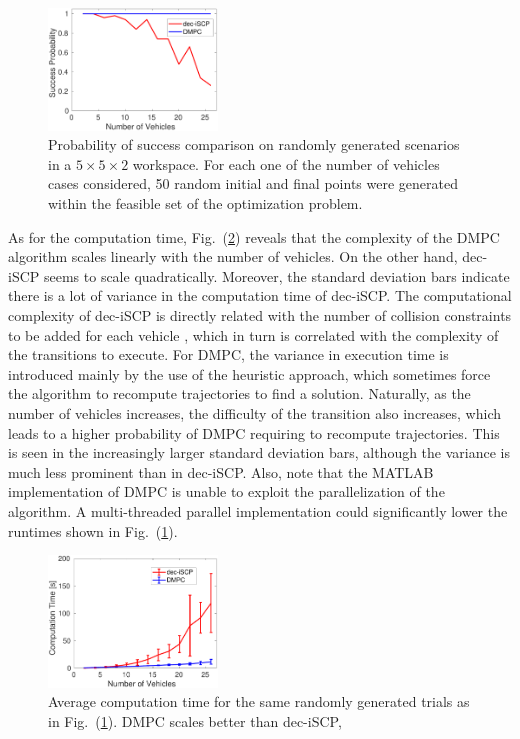 \begin{figure}[t]
	\centering
	\includegraphics[width=0.4\textwidth]{figures/comp_prob}
	\caption{Probability of success comparison on randomly generated scenarios in a $5 \times 5 \times 2$ workspace. For each one of the number of vehicles cases considered, 50 random initial and final points were generated within the feasible set of the optimization problem.}
	\label{fig:comp_prob}
\end{figure}

As for the computation time, Fig.~(\ref{fig:comp_time}) reveals that the complexity of the DMPC algorithm scales linearly with the number of vehicles. On the other hand, dec-iSCP seems to scale quadratically. Moreover, the standard deviation bars indicate there is a lot of variance in the computation time of dec-iSCP. The computational complexity of dec-iSCP is directly related with the number of collision constraints to be added for each vehicle \cite{chen2015decoupled}, which in turn is correlated with the complexity of the transitions to execute. For DMPC, the variance in execution time is introduced mainly by the use of the heuristic approach, which sometimes force the algorithm to recompute trajectories to find a solution. Naturally, as the number of vehicles increases, the difficulty of the transition also increases, which leads to a higher probability of DMPC requiring to recompute trajectories. This is seen in the increasingly larger standard deviation bars, although the variance is much less prominent than in dec-iSCP. Also, note that the MATLAB implementation of DMPC is unable to exploit the parallelization of the algorithm. A multi-threaded parallel implementation could significantly lower the runtimes shown in Fig.~(\ref{fig:comp_prob}).


\begin{figure}[t]
	\centering
	\includegraphics[width=0.4\textwidth]{figures/comp_time}
	\caption{Average computation time for the same randomly generated trials as in Fig.~(\ref{fig:comp_prob}). DMPC scales better than dec-iSCP, }
	\label{fig:comp_time}
\end{figure}
